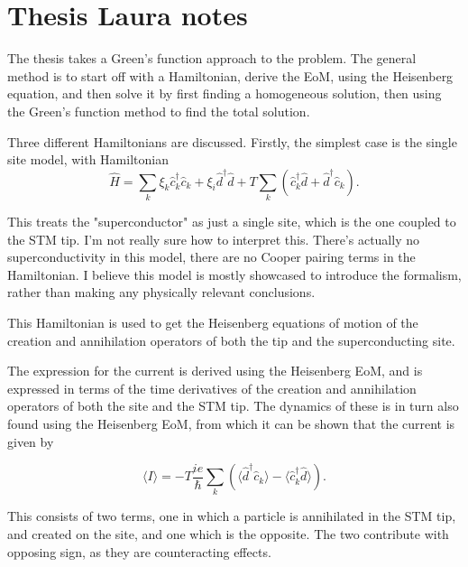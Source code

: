 \section{Thesis Laura notes}

The thesis takes a Green's function approach to the problem. The general method is to start off with a Hamiltonian, derive the EoM, using the Heisenberg equation, and then solve it by first finding a homogeneous solution, then using the Green's function method to find the total solution. 

Three different Hamiltonians are discussed. Firstly, the simplest case is the single site model, with Hamiltonian
\begin{equation}
    \hat{H} = \sum_{k}\xi_k \hat{c}^{\dagger}_k\hat{c}_k + \xi_i \hat{d}^\dagger\hat{d} + T\sum_k\left(\hat{c}^{\dagger}_k\hat{d} + \hat{d}^{\dagger}\hat{c}_k\right).
\end{equation}

This treats the "superconductor" as just a single site, which is the one coupled to the STM tip. I'm not really sure how to interpret this. There's actually no superconductivity in this model, there are no Cooper pairing terms in the Hamiltonian. I believe this model is mostly showcased to introduce the formalism, rather than making any physically relevant conclusions. 

This Hamiltonian is used to get the Heisenberg equations of motion of the creation and annihilation operators of both the tip and the superconducting site.

The expression for the current is derived using the Heisenberg EoM, and is expressed in terms of the time derivatives of the creation and annihilation operators of both the site and the STM tip. The dynamics of these is in turn also found using the Heisenberg EoM, from which it can be shown that the current is given by

\begin{equation}
    \langle I \rangle = -T\frac{ie}{\hbar}\sum_k\left(\langle\hat{d}^\dagger\hat{c}_k\rangle - \langle \hat{c}^\dagger_k \hat{d}\rangle\right).
\end{equation}

This consists of two terms, one in which a particle is annihilated in the STM tip, and created on the site, and one which is the opposite. The two contribute with opposing sign, as they are counteracting effects. 

